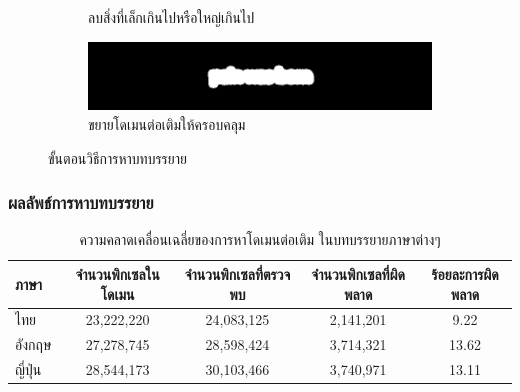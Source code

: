 \documentclass[xcolor=dvipsnames, xetex,serif]{beamer}
\numberwithin{equation}{section}
\begin{document}
\begin{frame}
\begin{figure}[H]
\begin{subfigure}{0.4\linewidth}
					\caption{ลบสิ่งที่เล็กเกินไปหรือใหญ่เกินไป}
				\end{subfigure}
				\begin{subfigure}{0.4\linewidth}
					\centering
					\includegraphics[width=0.8\linewidth]{images/subtitle_detection/detection-stoke.png}
					\caption{ขยายโดเมนต่อเติมให้ครอบคลุม}
				\end{subfigure}
				\caption{ขั้นตอนวิธีการหาบทบรรยาย}
			\end{figure}
		\end{frame}
		\begin{frame}
			\frametitle{ผลลัพธ์การหาบทบรรยาย}
			\begin{table}[H]
				\centering
				\footnotesize
				\begin{tabular}[ht]{|l|c|c|c|c|}
					\hline
					ภาษา  & จำนวนพิกเซลในโดเมน & จำนวนพิกเซลที่ตรวจพบ & จำนวนพิกเซลที่ผิดพลาด & ร้อยละการผิดพลาด \\
					\hline
					ไทย & 23,222,220 & 24,083,125 & 2,141,201 & 9.22 \\
					อังกฤษ & 27,278,745 & 28,598,424 & 3,714,321 & 13.62 \\
					ญี่ปุ่น & 28,544,173 & 30,103,466 & 3,740,971 & 13.11 \\
					\hline
				\end{tabular}
				\caption{ความคลาดเคลื่อนเฉลี่ยของการหาโดเมนต่อเติม ในบทบรรยายภาษาต่างๆ}
			\end{table}	
		\end{frame}
\end{document}
